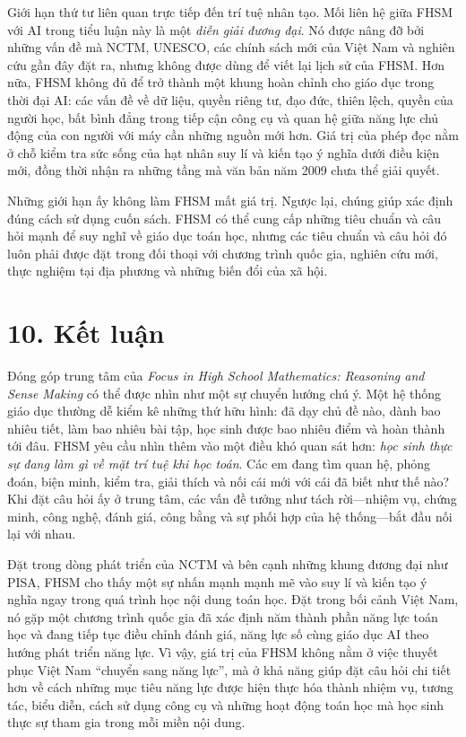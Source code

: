 Giới hạn thứ tư liên quan trực tiếp đến trí tuệ nhân tạo. Mối liên hệ giữa FHSM với AI trong tiểu luận này là một \emph{diễn giải đương đại}. Nó được nâng đỡ bởi những vấn đề mà NCTM, UNESCO, các chính sách mới của Việt Nam và nghiên cứu gần đây đặt ra, nhưng không được dùng để viết lại lịch sử của FHSM. Hơn nữa, FHSM không đủ để trở thành một khung hoàn chỉnh cho giáo dục trong thời đại AI: các vấn đề về dữ liệu, quyền riêng tư, đạo đức, thiên lệch, quyền của người học, bất bình đẳng trong tiếp cận công cụ và quan hệ giữa năng lực chủ động của con người với máy cần những nguồn mới hơn. Giá trị của phép đọc nằm ở chỗ kiểm tra sức sống của hạt nhân suy lí và kiến tạo ý nghĩa dưới điều kiện mới, đồng thời nhận ra những tầng mà văn bản năm 2009 chưa thể giải quyết.

Những giới hạn ấy không làm FHSM mất giá trị. Ngược lại, chúng giúp xác định đúng cách sử dụng cuốn sách. FHSM có thể cung cấp những tiêu chuẩn và câu hỏi mạnh để suy nghĩ về giáo dục toán học, nhưng các tiêu chuẩn và câu hỏi đó luôn phải được đặt trong đối thoại với chương trình quốc gia, nghiên cứu mới, thực nghiệm tại địa phương và những biến đổi của xã hội.

{}
\section*{10. Kết luận}

Đóng góp trung tâm của \emph{Focus in High School Mathematics: Reasoning and Sense Making} có thể được nhìn như một sự chuyển hướng chú ý. Một hệ thống giáo dục thường dễ kiểm kê những thứ hữu hình: đã dạy chủ đề nào, dành bao nhiêu tiết, làm bao nhiêu bài tập, học sinh được bao nhiêu điểm và hoàn thành tới đâu. FHSM yêu cầu nhìn thêm vào một điều khó quan sát hơn: \emph{học sinh thực sự đang làm gì về mặt trí tuệ khi học toán}. Các em đang tìm quan hệ, phỏng đoán, biện minh, kiểm tra, giải thích và nối cái mới với cái đã biết như thế nào? Khi đặt câu hỏi ấy ở trung tâm, các vấn đề tưởng như tách rời---nhiệm vụ, chứng minh, công nghệ, đánh giá, công bằng và sự phối hợp của hệ thống---bắt đầu nối lại với nhau.

Đặt trong dòng phát triển của NCTM và bên cạnh những khung đương đại như PISA, FHSM cho thấy một sự nhấn mạnh mạnh mẽ vào suy lí và kiến tạo ý nghĩa ngay trong quá trình học nội dung toán học. Đặt trong bối cảnh Việt Nam, nó gặp một chương trình quốc gia đã xác định năm thành phần năng lực toán học và đang tiếp tục điều chỉnh đánh giá, năng lực số cùng giáo dục AI theo hướng phát triển năng lực. Vì vậy, giá trị của FHSM không nằm ở việc thuyết phục Việt Nam ``chuyển sang năng lực'', mà ở khả năng giúp đặt câu hỏi chi tiết hơn về cách những mục tiêu năng lực được hiện thực hóa thành nhiệm vụ, tương tác, biểu diễn, cách sử dụng công cụ và những hoạt động toán học mà học sinh thực sự tham gia trong mỗi miền nội dung.

